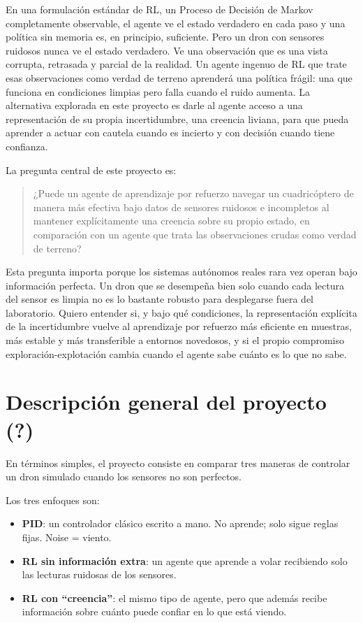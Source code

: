 \documentclass[11pt]{article}
\begin{document}
En una formulación estándar de RL, un Proceso de Decisión de Markov completamente observable,
el agente ve el estado verdadero en cada paso y una política sin memoria es, en principio,
suficiente. Pero un dron con sensores ruidosos nunca ve el estado verdadero.
Ve una observación que es una vista corrupta, retrasada y parcial de la realidad.
Un agente ingenuo de RL que trate esas observaciones como verdad de terreno aprenderá
una política frágil: una que funciona en condiciones limpias pero falla cuando el ruido aumenta.
La alternativa explorada en este proyecto es darle al agente acceso a una representación de su propia incertidumbre,
una creencia liviana, para que pueda aprender a actuar con cautela cuando es incierto y con
decisión cuando tiene confianza.

La pregunta central de este proyecto es:

\begin{quote}
¿Puede un agente de aprendizaje por refuerzo navegar un cuadricóptero
de manera más efectiva bajo datos de sensores ruidosos e incompletos al mantener explícitamente
una creencia sobre su propio estado, en comparación con un agente que trata las observaciones crudas
como verdad de terreno?
\end{quote}

Esta pregunta importa porque los sistemas autónomos reales rara vez operan bajo información perfecta.
Un dron que se desempeña bien solo cuando cada lectura del sensor es limpia no es lo bastante robusto
para desplegarse fuera del laboratorio. Quiero entender si, y bajo qué condiciones,
la representación explícita de la incertidumbre vuelve al aprendizaje por refuerzo más eficiente en muestras,
más estable y más transferible a entornos novedosos, y si el propio compromiso exploración-explotación
cambia cuando el agente sabe cuánto es lo que no sabe.

\newpage

\section*{Descripción general del proyecto (?)}

En términos simples, el proyecto consiste en comparar tres maneras de controlar un dron
simulado cuando los sensores no son perfectos.

Los tres enfoques son:
\begin{itemize}[leftmargin=1.8em]
    \item \textbf{PID}: un controlador clásico escrito a mano. No aprende; solo sigue reglas fijas. Noise = viento.
    \item \textbf{RL sin información extra}: un agente que aprende a volar recibiendo solo las lecturas ruidosas de los sensores.
    \item \textbf{RL con ``creencia''}: el mismo tipo de agente, pero que además recibe información sobre cuánto puede confiar en lo que está viendo.
\end{itemize}
\end{document}
